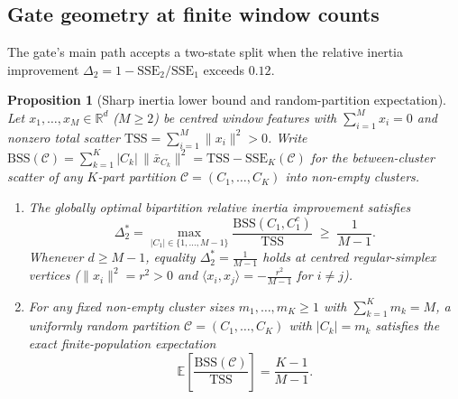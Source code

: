 \documentclass[11pt]{article}
\newtheorem{proposition}{Proposition}
\begin{document}
\subsection{Gate geometry at finite window counts}
\label{sec:gate-geometry}

The gate's main path accepts a two-state split when the relative inertia
improvement $\Delta_2=1-\mathrm{SSE}_2/\mathrm{SSE}_1$ exceeds $0.12$.

\begin{proposition}[Sharp inertia lower bound and random-partition expectation]
\label{prop:gate-geometry}
Let $x_1,\dots,x_M\in\mathbb R^d$ ($M\ge 2$) be centred window features with
$\sum_{i=1}^M x_i=0$ and nonzero total scatter
$\mathrm{TSS}=\sum_{i=1}^M\|x_i\|^2>0$. Write
$\mathrm{BSS}(\mathcal C)=\sum_{k=1}^K |C_k|\,\|\bar x_{C_k}\|^2=\mathrm{TSS}-\mathrm{SSE}_K(\mathcal C)$
for the between-cluster scatter of any $K$-part partition $\mathcal C=(C_1,\dots,C_K)$
into non-empty clusters.
\begin{enumerate}
\item[(i)] The globally optimal bipartition relative inertia improvement
satisfies
\begin{equation}
\Delta_2^{*}=\max_{|C_1|\in\{1,\dots,M-1\}}\frac{\mathrm{BSS}(C_1,C_1^c)}{\mathrm{TSS}}\;\ge\;\frac{1}{M-1}.
\label{eq:gate-lower-bound}
\end{equation}
Whenever $d\ge M-1$, equality $\Delta_2^{*}=\frac{1}{M-1}$ holds at centred
regular-simplex vertices ($\|x_i\|^2=r^2>0$ and $\langle x_i,x_j\rangle=-\frac{r^2}{M-1}$ for $i\neq j$).
\item[(ii)] For any fixed non-empty cluster sizes $m_1,\dots,m_K\ge 1$ with
$\sum_{k=1}^K m_k=M$, a uniformly random partition $\mathcal C=(C_1,\dots,C_K)$
with $|C_k|=m_k$ satisfies the exact finite-population expectation
\begin{equation*}
\mathbb E\left[\frac{\mathrm{BSS}(\mathcal C)}{\mathrm{TSS}}\right]=\frac{K-1}{M-1}.
\end{equation*}
\end{enumerate}
\end{proposition}
\end{document}
